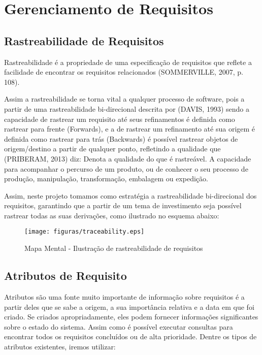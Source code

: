 \chapter[Gerenciamento de Requisitos]{Gerenciamento de Requisitos}\label{cap1}
\section{Rastreabilidade de Requisitos}
  Rastreabilidade é a propriedade de uma especificação de requisitos que reflete a
facilidade de encontrar os requisitos relacionados (SOMMERVILLE, 2007, p. 108).

  Assim a rastreabilidade se torna vital a qualquer processo de software, pois a partir de
uma rastreabilidade bi-direcional descrita por (DAVIS, 1993) sendo a capacidade de rastrear um
requisito até seus refinamentos é definida como rastrear para frente (Forwards), e a de
rastrear um refinamento até sua origem é definida como rastrear para trás (Backwards) é possível
rastrear objetos de origem/destino a partir de qualquer ponto, refletindo a qualidade que (PRIBERAM, 2013)
diz: Denota a qualidade do que é rastreável. A capacidade para acompanhar o percurso de um produto, ou de
conhecer o seu processo de produção, manipulação, transformação, embalagem ou expedição.

  Assim, neste projeto tomamos como estratégia a rastreabilidade bi-direcional dos requisitos, garantindo
   que a partir de um tema de investimento seja possível rastrear todas as suas derivações,
como ilustrado no esquema abaixo:

\begin{figure}[H]
    \centering
	\texttt{[image: figuras/traceability.eps]}
    \caption{Mapa Mental - Ilustração de rastreabilidade de requisitos}
    \label{fig:processo}
\end{figure}

\section{Atributos de Requisito}

  Atributos são uma fonte muito importante de informação sobre requisitos é a partir deles que se sabe a
origem, a sua importância relativa e a data em que foi criado. Se criados apropriadamente,
eles podem fornecer informações significantes sobre o estado do sistema.
Assim como é possível executar consultas para encontrar todos os requisitos
concluídos ou de alta prioridade.
  Dentre os tipos de atributos existentes, iremos utilizar:
